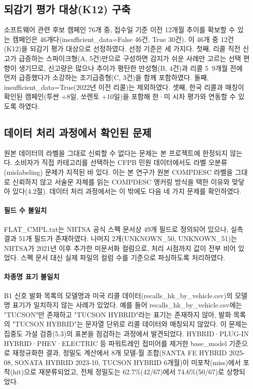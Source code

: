 \documentclass[11pt]{article}
\begin{document}
\subsection{되감기 평가 대상(K12) 구축}

소프트웨어 관련 후보 캠페인 76개 중, 접수일 기준 이전 12개월 추이를 확보할 수 있는 캠페인은 46개다(insufficient\_data=False 46건, True 30건).
이 46개 중 12건(K12)을 되감기 평가 대상으로 선정하였다. 선정 기준은 세 가지다. 첫째, 리콜 직전 신고가 급증하는 스파이크형(A, 5건)만으로 구성하면 감지가 쉬운 사례만 고르는 선택 편향이 생기므로, 신고량은 많으나 추이가 평탄한 만성형(B, 4건)과 리콜 5~9개월 전에 먼저 급증했다가 소강하는 조기급증형(C, 3건)을 함께 포함하였다. 둘째, insufficient\_data=True(2022년 이전 리콜)는 제외하였다. 셋째, 한국 리콜과 매칭이 확인된 캠페인(투싼 +8일, 쏘렌토 +10일)을 포함해 한·미 시차 평가와 연동할 수 있도록 하였다.

\subsection{데이터 처리 과정에서 확인된 문제}

원본 데이터의 라벨을 그대로 신뢰할 수 없다는 문제는 본 프로젝트에 한정되지 않는다. 소비자가 직접 카테고리를 선택하는 CFPB 민원 데이터에서도 라벨 오분류(mislabeling) 문제가 지적된 바 있다\cite{bastani_lda_cfpb}. 이는 본 연구가 원본 COMPDESC 라벨을 그대로 신뢰하지 않고 서술문 자체를 읽는 COMPDESC 앵커링 방식을 택한 이유와 맞닿아 있다(4.2절). 데이터 처리 과정에서는 이 밖에도 다음 네 가지 문제를 확인하였다.

\paragraph{필드 수 불일치} FLAT\_CMPL.txt는 NHTSA 공식 스펙 문서상 49개 필드로 정의되어 있으나, 실측 결과 51개 필드가 존재하였다. 나머지 2개(UNKNOWN\_50, UNKNOWN\_51)는 NHTSA가 2021년 이후 추가한 미문서화 컬럼으로, 처리 시점까지 값이 전부 비어 있었다. 스펙 문서 대신 실제 파일의 컬럼 수를 기준으로 파싱하도록 처리하였다.

\paragraph{차종명 표기 불일치} B1 신호 발화 목록의 모델명과 미국 리콜 데이터(recalls\_hk\_by\_vehicle.csv)의 모델명 표기가 일치하지 않는 사례가 있었다. 예를 들어 recalls\_hk\_by\_vehicle.csv에는 "TUCSON"만 존재하고 "TUCSON HYBRID"라는 표기는 존재하지 않아, 발화 목록의 "TUCSON HYBRID"는 문자열 단위로 리콜 데이터와 매칭되지 않았다. 이 문제는 집중도 가설 검증(5.3)의 표본을 점검하는 과정에서 발견되었다. HYBRID·PLUG-IN HYBRID·PHEV·ELECTRIC 등 파워트레인 접미어를 제거한 base\_model 기준으로 재정규화한 결과, 정밀도 계산에서 8개 모델-월 조합(SANTA FE HYBRID 2025-08, SONATA HYBRID 2023-10, TUCSON HYBRID 6개월)이 미포착(miss)에서 포착(hit)으로 재분류되었고, 전체 정밀도는 62.7\%(42/67)에서 74.6\%(50/67)로 상향되었다.
\end{document}
